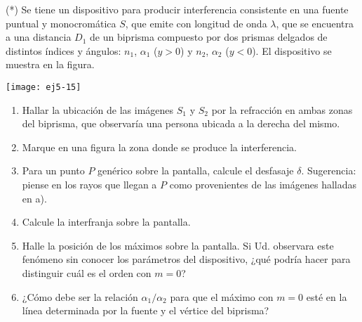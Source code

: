 \item 
\begin{minipage}[t][3cm]{0.6\textwidth}
(*) Se tiene un dispositivo para producir interferencia consistente en una fuente puntual y monocromática $S$, que emite con longitud de onda $\lambda$, que se encuentra a una distancia $D_1$ de un biprisma compuesto por dos prismas delgados de distintos índices y ángulos: $n_1$, $\alpha_1$ ($y>0$) y $n_2$, $\alpha_2$ ($y<0$).
El dispositivo se muestra en la figura.
\end{minipage}
\begin{minipage}[c][2cm][t]{0.35\textwidth}
	\texttt{[image: ej5-15]}
\end{minipage}
\begin{enumerate}
	\item Hallar la ubicación de las imágenes $S_1$ y $S_2$ por la refracción en ambas zonas del biprisma, que observaría una persona ubicada a la derecha del mismo. 
	\item Marque en una figura la zona donde se produce la interferencia.
	\item Para un punto $P$ genérico sobre la pantalla, calcule el desfasaje $\delta$. Sugerencia: piense en los rayos que llegan a $P$ como provenientes de las imágenes halladas en a).
	\item Calcule la interfranja sobre la pantalla. 
	\item Halle la posición de los máximos sobre la pantalla.
	Si Ud. observara este fenómeno sin conocer los parámetros del dispositivo, ¿qué podría hacer para distinguir cuál es el orden con $m = 0$? 
	\item ¿Cómo debe ser la relación $\alpha_1/\alpha_2$ para que el máximo con $m = 0$ esté en la línea determinada por la fuente y el vértice del biprisma?
\end{enumerate}
